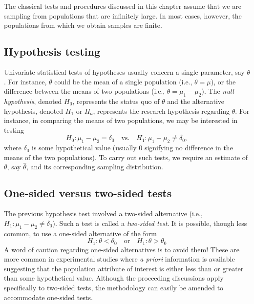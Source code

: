 \documentclass[]{book}
\theoremstyle{definition}
\theoremstyle{definition}
\theoremstyle{definition}
\theoremstyle{remark}
\begin{document}
The classical tests and procedures discussed in this chapter assume that
we are sampling from populations that are infinitely large. In most
cases, however, the populations from which we obtain samples are finite.

\hypertarget{hypothesis-testing}{%
\subsection{Hypothesis testing}\label{hypothesis-testing}}

Univariate statistical tests of hypotheses usually concern a single
parameter, say \(\theta\). For instance, \(\theta\) could be the mean of
a single population (i.e., \(\theta = \mu\)), or the difference between
the means of two populations (i.e., \(\theta = \mu_1 - \mu_2\)). The
\emph{null hypothesis}, denoted \(H_0\), represents the status quo of
\(\theta\) and the alternative hypothesis, denoted \(H_1\) or \(H_a\),
represents the research hypothesis regarding \(\theta\). For instance,
in comparing the means of two populations, we may be interested in
testing \[
H_0: \mu_1 - \mu_2 = \delta_0 \quad \text{vs.} \quad H_1: \mu_1 - \mu_2 \ne \delta_0,
\] where \(\delta_0\) is some hypothetical value (usually \(0\)
signifying no difference in the means of the two populations). To carry
out such tests, we require an estimate of \(\theta\), say
\(\widehat{\theta}\), and its corresponding sampling distribution.

\hypertarget{one-sided-versus-two-sided-tests}{%
\subsection{One-sided versus two-sided
tests}\label{one-sided-versus-two-sided-tests}}

The previous hypothesis test involved a two-sided alternative (i.e.,
\(H_1: \mu_1 - \mu_2 \ne \delta_0\)). Such a test is called a
\emph{two-sided test}. It is possible, though less common, to use a
one-sided alternative of the form \[
H_1: \theta < \theta_0 \quad \text{or} \quad H_1: \theta > \theta_0
\] A word of caution regarding one-sided alternatives is to avoid them!
These are more common in experimental studies where \emph{a priori}
information is available suggesting that the population attribute of
interest is either less than or greater than some hypothetical value.
Although the proceeding discussions apply specifically to two-sided
tests, the methodology can easily be amended to accommodate one-sided
tests.
\end{document}

